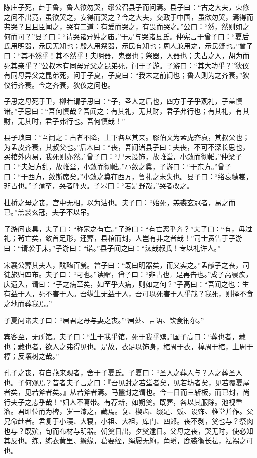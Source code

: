 \documentclass[]{article}
\begin{document}
陈庄子死，赴于鲁，鲁人欲勿哭，缪公召县子而问焉。县子曰：``古之大夫，束修之问不出竟，虽欲哭之，安得而哭之？今之大夫，交政于中国，虽欲勿哭，焉得而弗哭？且且臣闻之，哭有二道：有爱而哭之，有畏而哭之。''公曰：``然，然则如之何而可？''县子曰：``请哭诸异姓之庙。''于是与哭诸县氏。仲宪言于曾子曰：``夏后氏用明器，示民无知也；殷人用祭器，示民有知也；周人兼用之，示民疑也。''曾子曰：``其不然乎！其不然乎！夫明器，鬼器也；祭器，人器也；夫古之人，胡为而死其亲乎？''公叔木有同母异父之昆弟死，问于子游。子游曰：``其大功乎？''狄仪有同母异父之昆弟死，问于子夏，子夏曰：``我未之前闻也；鲁人则为之齐衰。''狄仪行齐衰。今之齐衰，狄仪之问也。

子思之母死于卫，柳若谓子思曰：``子，圣人之后也，四方于子乎观礼，子盖慎诸。''子思曰：``吾何慎哉？吾闻之：有其礼，无其财，君子弗行也；有其礼，有其财，无其时，君子弗行也。吾何慎哉！''

县子琐曰：``吾闻之：古者不降，上下各以其亲。滕伯文为孟虎齐衰，其叔父也；为孟皮齐衰，其叔父也。''后木曰：``丧，吾闻诸县子曰：夫丧，不可不深长思也，买棺外内易，我死则亦然。''曾子曰：``尸未设饰，故帷堂，小敛而彻帷。''仲梁子曰：``夫妇方乱，故帷堂，小敛而彻帷。''小敛之奠，子游曰：``于东方。''曾子曰：``于西方，敛斯席矣。''小敛之奠在西方，鲁礼之末失也。县子曰：``绤衰繐裳，非古也。''子蒲卒，哭者呼灭。子皋曰：``若是野哉。''哭者改之。

杜桥之母之丧，宫中无相，以为沽也。夫子曰：``始死，羔裘玄冠者，易之而已。''羔裘玄冠，夫子不以吊。

子游问丧具，夫子曰：``称家之有亡。''子游曰：``有亡恶乎齐？''夫子曰：``有，毋过礼；茍亡矣，敛首足形，还葬，县棺而封，人岂有非之者哉！''司士贲告于子游曰：``请袭于床。''子游曰：``诺。''县子闻之曰：``汰哉叔氏！专以礼许人。''

宋襄公葬其夫人，酰醢百瓮。曾子曰：``既曰明器矣，而又实之。''孟献子之丧，司徒旅归四布。夫子曰：``可也。''读赗，曾子曰：``非古也，是再告也。''成子高寝疾，庆遗入，请曰：``子之病革矣，如至乎大病，则如之何？''子高曰：``吾闻之也：生有益于人，死不害于人。吾纵生无益于人，吾可以死害于人乎哉？我死，则择不食之地而葬我焉。''

子夏问诸夫子曰：``居君之母与妻之丧。''``居处、言语、饮食衎尔。''

宾客至，无所馆。夫子曰：``生于我乎馆，死于我乎殡。''国子高曰：``葬也者，藏也；藏也者，欲人之弗得见也。是故，衣足以饰身，棺周于衣，椁周于棺，土周于椁；反壤树之哉。''

孔子之丧，有自燕来观者，舍于子夏氏。子夏曰：``圣人之葬人与？人之葬圣人也。子何观焉？昔者夫子言之曰：『吾见封之若堂者矣，见若坊者矣，见若覆夏屋者矣，见若斧者矣。』从若斧者焉。马鬣封之谓也。今一日而三斩板，而已封，尚行夫子之志乎哉！''妇人不葛带。有荐新，如朔奠。既葬，各以其服除。池视重溜。君即位而为椑，岁一漆之，藏焉。复、楔齿、缀足、饭、设饰、帷堂并作。父兄命赴者。君复于小寝、大寝，小祖、大祖，库门、四郊。丧不剥，奠也与？祭肉也与？既殡，旬而布材与明器。朝奠日出，夕奠逮日。父母之丧，哭无时，使必知其反也。练，练衣黄里、縓缘，葛要绖，绳屦无絇，角瑱，鹿裘衡长袪，袪裼之可也。
\end{document}
